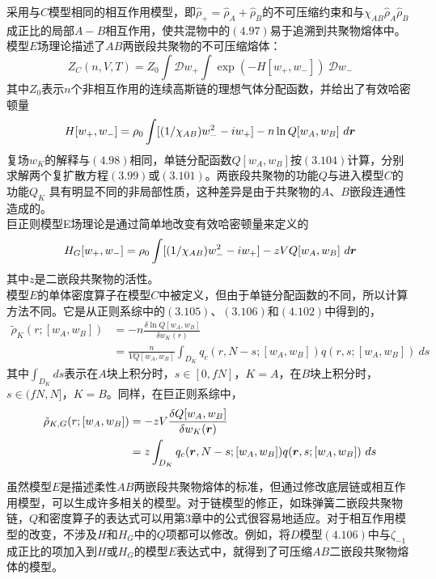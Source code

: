 采用与$C$模型相同的相互作用模型，即$\hat{\rho}_{+}=\hat{\rho}_{A}+\hat{\rho}_{B}$的不可压缩约束和与$\chi_{AB} \hat{\rho}_{A} \hat{\rho}_{B}$成正比的局部$A-B$相互作用，使共混物中的$(4.97)$易于追溯到共聚物熔体中。模型$E$场理论描述了$AB$两嵌段共聚物的不可压缩熔体：\\
\begin{equation}
Z_{C}(n,V,T)=Z_{0} \int \mathcal{D} w_{+} \int  \exp (-H[w_{+},w_{-}])~\mathcal{D} w_{-}
\end{equation}
其中$Z_0$表示$n$个非相互作用的连续高斯链的理想气体分配函数，并给出了有效哈密顿量\\
\begin{equation}
H[ w_{+}, w_{-}]= \rho_{0} \int  [(1/\chi_{AB})w_{-}^{2}-i w_{+}]-n \ln Q[w_{A},w_{B}]~d \bm{r}
\end{equation}
复场$w_{K}$的解释与$(4.98)$相同，单链分配函数$Q[w_{A},w_{B}]$按$(3.104)$计算，分别求解两个复扩散方程$(3.99)$或$(3.101)$。两嵌段共聚物的功能$Q$与进入模型$C$的功能$Q_{K}$ 具有明显不同的非局部性质，这种差异是由于共聚物的$A$、$B$嵌段连通性造成的。\\

巨正则模型E场理论是通过简单地改变有效哈密顿量来定义的\\
\begin{equation}
H_{G}[ w_{+}, w_{-}]= \rho_{0} \int  [(1/\chi_{AB}) w_{-}^{2}-i w_{+}]- z  V Q[w_{A},w_{B}]~d\bm{r}
\end{equation}
其中$z$是二嵌段共聚物的活性。\\

模型$E$的单体密度算子在模型$C$中被定义，但由于单链分配函数的不同，所以计算方法不同。它是从正则系综中的$(3.105)$、$(3.106)$和$(4.102)$中得到的，\\
\begin{equation}
\begin{aligned}
\tilde{\rho}_{K}(r;[w_{A},w_{B}]) &=-n \frac{\delta \ln Q[w_{A},w_{B}]}{\delta w_{K}(r)} \\&= \frac{n}{V Q[w_{A},w_{B}]} \int_{D_{K}} q_{c}(r,N-s;[w_{A},w_{B}])q(r,s;[w_{A},w_{B}])~ds
\end{aligned}
\end{equation}
其中$\int_{D_{K}} ds$表示在$A$块上积分时，$s\in[0,fN]$，$K=A$，在$B$块上积分时，$s\in(fN,N]$，$K=B$。同样，在巨正则系综中，\\
\begin{equation}
\begin{aligned}
\tilde{\rho}_{K,G}(r;[w_{A},w_{B}])&=-z V \frac{\delta Q[w_{A},w_{B}]}{\delta w_{K}(\bm{r})} \\&= z \int_{D_{K}}  q_{c}(\bm{r},N-s;[w_{A},w_{B}])q(\bm{r},s;[w_{A},w_{B}])~d s
\end{aligned}
\end{equation}

虽然模型$E$是描述柔性$AB$两嵌段共聚物熔体的标准，但通过修改底层链或相互作用模型，可以生成许多相关的模型。对于链模型的修正，如珠弹簧二嵌段共聚物链，$Q$和密度算子的表达式可以用第3章中的公式很容易地适应。对于相互作用模型的改变，不涉及$H$和$H_{G}$中的$Q$项都可以修改。例如，将$D$模型$(4.106)$中与$\zeta_{-1}$成正比的项加入到$H$或$H_{G}$的模型$E$表达式中，就得到了可压缩$AB$二嵌段共聚物熔体的模型。

